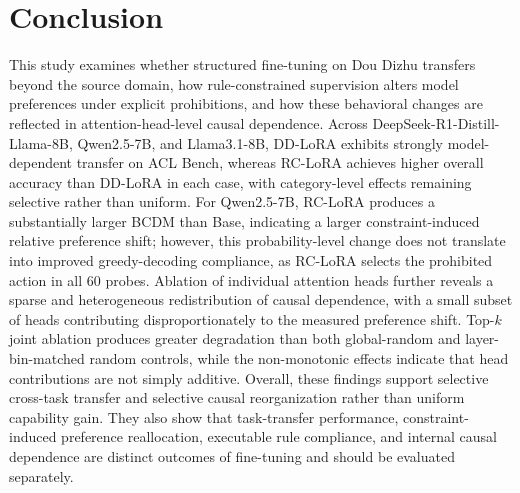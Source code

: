 \section{Conclusion}
\label{sec:conclusion}

This study examines whether structured fine-tuning on Dou Dizhu transfers beyond the source domain, how rule-constrained supervision alters model preferences under explicit prohibitions, and how these behavioral changes are reflected in attention-head-level causal dependence. Across DeepSeek-R1-Distill-Llama-8B, Qwen2.5-7B, and Llama3.1-8B, DD-LoRA exhibits strongly model-dependent transfer on ACL Bench, whereas RC-LoRA achieves higher overall accuracy than DD-LoRA in each case, with category-level effects remaining selective rather than uniform. For Qwen2.5-7B, RC-LoRA produces a substantially larger BCDM than Base, indicating a larger constraint-induced relative preference shift; however, this probability-level change does not translate into improved greedy-decoding compliance, as RC-LoRA selects the prohibited action in all 60 probes. Ablation of individual attention heads further reveals a sparse and heterogeneous redistribution of causal dependence, with a small subset of heads contributing disproportionately to the measured preference shift. Top-$k$ joint ablation produces greater degradation than both global-random and layer-bin-matched random controls, while the non-monotonic effects indicate that head contributions are not simply additive. Overall, these findings support selective cross-task transfer and selective causal reorganization rather than uniform capability gain. They also show that task-transfer performance, constraint-induced preference reallocation, executable rule compliance, and internal causal dependence are distinct outcomes of fine-tuning and should be evaluated separately.
